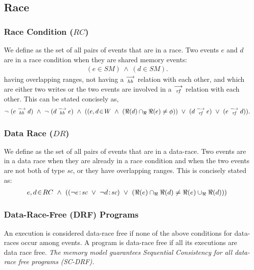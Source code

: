 
        
    \subsection{Race}
        \subsubsection{Race Condition ($RC$)}
            We define  as the set of all pairs of events that are in a race. Two events $e$ and $d$ are in a race condition when they are shared memory events:
                \begin{align*}
                    (e \in SM)\ \wedge\ (d \in SM).
                \end{align*}
            having overlapping ranges, not having a $\stackrel{\longrightarrow}{_\textit{hb}}$ relation with each other, and which are either two writes or the two events are involved in a $\stackrel{\longrightarrow}{_\textit{rf}}$ relation with each other. This can be stated concisely as,
                \begin{align*}
                    \neg \ (\reln{e}{hb}{d})\ \wedge\ \neg \ (\reln{d}{hb}{e}) 
                    \ \wedge \ 
                     (
                     (\event{e,d}{W}\  \wedge\ (\Re(d) \cap_{\Re} \Re(e) \neq \phi)) 
                          \  \vee\ (d \stck{_\textit{rf}} e)\ \vee\ (e \stck{_\textit{rf}} d)
                    ).
                \end{align*}
                
        \subsubsection{Data Race ($DR$)}
            We define  as the set of all pairs of events that are in a data-race. Two events are in a data race when they are already in a race condition and when the two events are not both of type \textit{sc}, or they have overlapping ranges. This is concisely stated as:  
                \begin{align*}
                    \event{e,d}{RC}  \ \wedge \ 
                    ((\neg\et{e}{sc} \ \vee \ \neg\et{d}{sc}) \ \vee \ 
                    (\Re(e) \cap_{\Re} \Re(d) \neq \Re(e) \cup_{\Re} \Re(d))) 
                \end{align*}

        \subsubsection{Data-Race-Free (DRF) Programs}
            An execution is considered data-race free if none of the above conditions for data-races occur among events. A program is data-race free if all its executions are data race free.          
            \textit{The memory model guarantees Sequential Consistency for all data-race free programs (SC-DRF).}
            